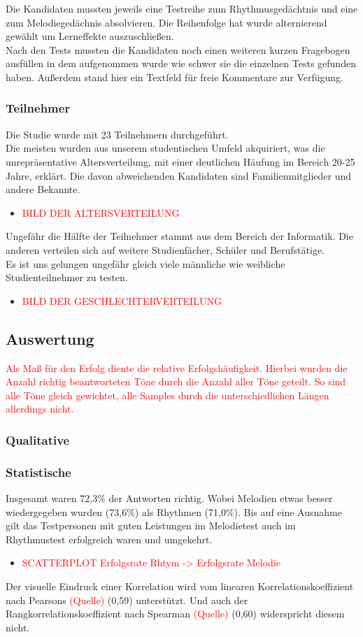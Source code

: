 \documentclass{acm_proc_article-sp}
\begin{document}
Die Kandidaten mussten jeweils eine Testreihe zum Rhythmusgedächtnis und eine zum Melodiegedächnis absolvieren. Die Reihenfolge hat wurde alternierend gewählt um Lerneffekte auszuschließen. \\
Nach den Tests mussten die Kandidaten noch einen weiteren kurzen Fragebogen ausfüllen in dem aufgenommen wurde wie schwer sie die einzelnen Tests gefunden haben. Außerdem stand hier ein Textfeld für freie Kommentare zur Verfügung. 
\subsubsection{Teilnehmer}
Die Studie wurde mit 23 Teilnehmern durchgeführt.\\
Die meisten wurden aus unserem studentischen Umfeld akquiriert, was die unrepräsentative Altersverteilung, mit einer deutlichen Häufung im Bereich 20-25 Jahre, erklärt. Die davon abweichenden Kandidaten sind Familienmitglieder und andere Bekannte.
\begin{itemize} 
\item \textcolor{red}{BILD DER ALTERSVERTEILUNG}
\end{itemize}
Ungefähr die Hälfte der Teilnehmer stammt aus dem Bereich der Informatik. Die anderen verteilen sich auf weitere Studienfächer, Schüler und Berufstätige.\\
Es ist uns gelungen ungefähr gleich viele männliche wie weibliche Studienteilnehmer zu testen. 
\begin{itemize} 
\item \textcolor{red}{BILD DER GESCHLECHTERVERTEILUNG}
\end{itemize}
\subsection{Auswertung}
\textcolor{red}{Als Maß für den Erfolg diente die relative Erfolgshäufigkeit. Hierbei wurden die Anzahl richtig beantworteten Töne durch die Anzahl aller Töne geteilt. So sind alle Töne gleich gewichtet, alle Samples durch die unterschiedlichen Längen allerdings nicht.}
\subsubsection{Qualitative}
\subsubsection{Statistische}
Insgesamt waren 72,3\% der Antworten richtig. Wobei Melodien etwas besser wiedergegeben wurden (73,6\%) als Rhythmen (71,0\%). Bis auf eine Ausnahme gilt das Testpersonen mit guten Leistungen im Melodietest auch im Rhythmustest erfolgreich waren und umgekehrt.
\begin{itemize} 
\item \textcolor{red}{SCATTERPLOT Erfolgsrate Rhtym -> Erfolgsrate Melodie}
\end{itemize}
Der visuelle Eindruck einer Korrelation wird vom linearen Korrelationskoeffizient nach Pearsons \textcolor{red}{(Quelle)} (0,59) unterstützt. Und auch der Rangkorrelationskoeffizient nach Spearman \textcolor{red}{(Quelle)} (0,60) widerspricht diesem nicht.\\
\end{document}
